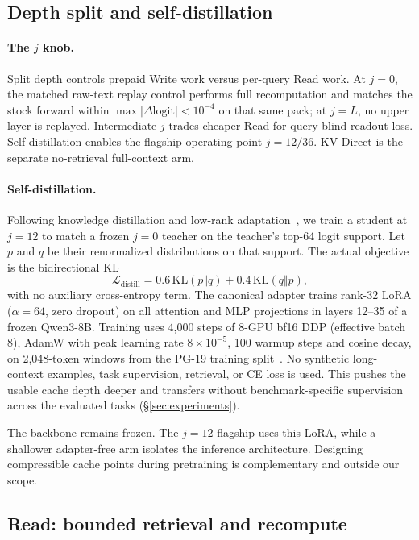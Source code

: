 \subsection{Depth split and self-distillation}
\label{subsec:jknob}
\paragraph{The $j$ knob.} Split depth controls prepaid Write work versus
per-query Read work. At $j{=}0$, the matched raw-text replay control performs full
recomputation and matches the stock forward within
$\max|\Delta\mathrm{logit}|<10^{-4}$ on that same pack;
at $j{=}L$, no upper layer is replayed. Intermediate $j$ trades cheaper Read for
query-blind readout loss. Self-distillation enables the flagship operating point
$j{=}12/36$. KV-Direct is the separate no-retrieval full-context arm.

\paragraph{Self-distillation.} Following knowledge distillation and low-rank
adaptation~\citep{distillation,lora}, we train a student at $j{=}12$ to match a
frozen $j{=}0$ teacher on the teacher's
top-64 logit support. Let $p$ and $q$ be their renormalized distributions on
that support. The actual objective is the bidirectional KL
\begin{equation}
\mathcal L_{\mathrm{distill}}
=0.6\,\mathrm{KL}(p\Vert q)+0.4\,\mathrm{KL}(q\Vert p),
\label{eq:distill}
\end{equation}
with no auxiliary cross-entropy term. The canonical adapter trains rank-32 LoRA
($\alpha{=}64$, zero dropout) on all attention and MLP
projections in layers 12--35 of a frozen Qwen3-8B. Training uses 4,000 steps of
8-GPU bf16 DDP (effective batch 8), AdamW with peak learning rate
$8{\times}10^{-5}$, 100 warmup steps and cosine decay, on 2,048-token windows
from the PG-19 training split~\citep{pg19}. No synthetic long-context examples,
task supervision,
retrieval, or CE loss is used. This pushes the usable cache depth deeper and
transfers without benchmark-specific supervision across the evaluated tasks
(\S\ref{sec:experiments}).

The backbone remains frozen. The $j{=}12$ flagship uses this LoRA, while a
shallower adapter-free arm isolates the inference architecture. Designing
compressible cache points during pretraining is complementary and outside our
scope.

\subsection{Read: bounded retrieval and recompute}
\label{subsec:read}

